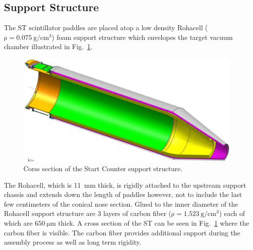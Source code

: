 \subsection{Support Structure} \label{sec:design_support}

The ST scintillator paddles are placed atop a low density Rohacell ($\mathrm{\rho = 0.075\ g/cm^{3}}$) foam support structure which envelopes the target vacuum chamber illustrated in Fig.~\ref{fig:stiso}.
	\begin{figure}[!htb]
		\centering
		\includegraphics[width=1.0\columnwidth]{design/figs/st_iso}
		\caption{Corss section of the Start Counter support structure.}
		\label{fig:stiso}
	\end{figure}
The Rohacell, which is 11~mm thick, is rigidly attached to the upstream support chassis and extends down the length of paddles however, not to include the last few centimeters of the conical nose section.  Glued to the inner diameter of the Rohacell support structure are 3 layers of carbon fiber ($\mathrm{\rho = 1.523\ g/cm^{3}}$) each of which are $\mathrm{650\ \mu m}$ thick.  A cross section of the ST can be seen in Fig.~\ref{fig:stiso} where the carbon fiber is visible.  The carbon fiber provides additional support during the assembly process as well as long term rigidity.  

